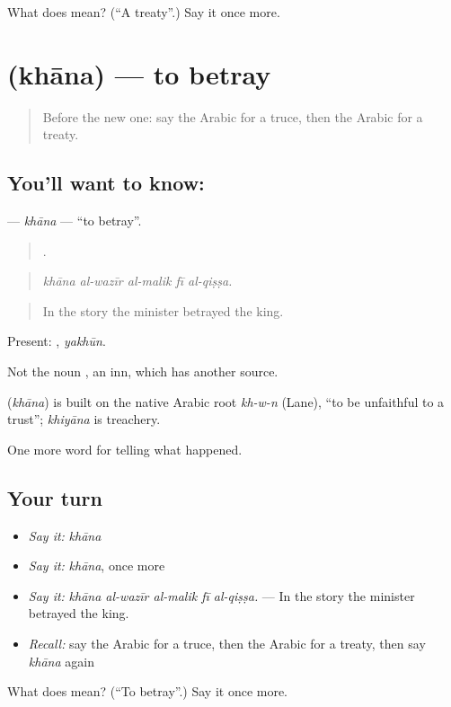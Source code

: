 \begin{tcolorbox}[breakable,colback=teal!4,colframe=teal!35!black,title={Before you move on}]
What does  mean? (\textquotedblleft{}A treaty\textquotedblright{}.) Say it once more.
\end{tcolorbox}
\section[\texorpdfstring{\ar{خان} (khāna)}{خان (khāna)}]{ (khāna) — to betray}

\label{lesson:AR-C341-khana}



\begin{quote}
Before the new one: say the Arabic for a truce, then the Arabic for a treaty.
\end{quote}

\subsection*{You'll want to know: }
\textbf{} — \emph{khāna} — \textquotedblleft{}to betray\textquotedblright{}.

\begin{quote}
    .
\end{quote}

\begin{quote}
\emph{khāna al-wazīr al-malik fī al-qiṣṣa.}
\end{quote}

\begin{quote}
In the story the minister betrayed the king.
\end{quote}

Present: , \emph{yakhūn}.

Not the noun , an inn, which has another source.

\begin{cousinweb}
\textbf{} (\emph{khāna}) is built on the native Arabic root \emph{kh-w-n} (Lane), \textquotedblleft{}to be unfaithful to a trust\textquotedblright{}; \emph{khiyāna} is treachery.
\end{cousinweb}

\begin{grammarlens}[title={What you've built}]
One more word for telling what happened.
\end{grammarlens}

\subsection*{Your turn}
\begin{itemize}
\raggedright
  \item \emph{Say it:} \emph{khāna}
  \item \emph{Say it:} \emph{khāna}, once more
  \item \emph{Say it:} \emph{khāna al-wazīr al-malik fī al-qiṣṣa.} — In the story the minister betrayed the king.
  \item \emph{Recall:} say the Arabic for a truce, then the Arabic for a treaty, then say \emph{khāna} again
\end{itemize}

\begin{tcolorbox}[breakable,colback=teal!4,colframe=teal!35!black,title={Before you move on}]
What does  mean? (\textquotedblleft{}To betray\textquotedblright{}.) Say it once more.
\end{tcolorbox}
